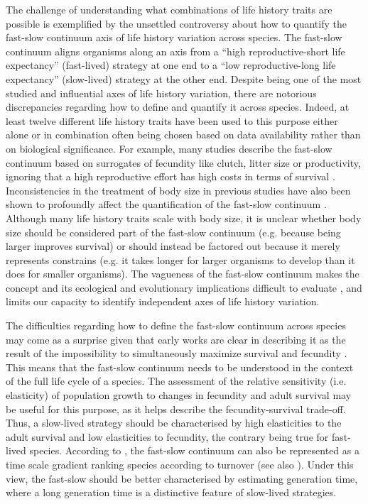 The challenge of understanding what combinations of life history traits are
possible is exemplified by the unsettled controversy about how to quantify the
fast-slow continuum axis of life history variation across species. The fast-slow
continuum aligns organisms along an axis from a “high reproductive-short life
expectancy” (fast-lived) strategy at one end to a “low reproductive-long life
expectancy” (slow-lived) strategy at the other end. Despite being one of the
most studied and influential axes of life history variation, there are notorious
discrepancies regarding how to define and quantify it across species. Indeed, at
least twelve different life history traits have been used to this purpose either
alone or in combination often being chosen based on data availability rather
than on biological significance. For example, many studies describe the
fast-slow continuum based on surrogates of fecundity like clutch, litter size
or productivity, ignoring that a high reproductive effort has high costs in
terms of survival \citep{Adler2014}. Inconsistencies in the treatment of body
size in previous studies have also been shown to profoundly affect the
quantification of the fast-slow continuum \citep{Jeschke2009}.
Although many life history traits scale with body size, it is unclear whether
body size should be considered part of the fast-slow continuum (e.g. because
being larger improves survival) or should instead be factored out because it
merely represents constrains (e.g. it takes longer for larger organisms to
develop than it does for smaller organisms). The vagueness of the fast-slow
continuum makes the concept and its ecological and evolutionary implications
difficult to evaluate \citep{Jeschke2009}, and limits our capacity to identify
independent axes of life history variation.

The difficulties regarding how to define the fast-slow continuum across species
may come as a surprise given that early works are clear in describing it as the
result of the impossibility to simultaneously maximize survival and fecundity
\citep{Stearns1983a, Saether1988}. This means that the fast-slow continuum needs
to be understood in the context of the full life cycle of a species. The
assessment of the relative sensitivity (i.e. elasticity) of population growth to
changes in fecundity and adult survival may be useful for this purpose, as it
helps describe the fecundity-survival trade-off. Thus, a slow-lived strategy
should be characterised by high elasticities to the adult survival and low
elasticities to fecundity, the contrary being true for fast-lived species.
According to \citet{Gaillard1989}, the fast-slow continuum can also be 
represented as a time scale gradient ranking species according to turnover (see 
also \citet{Jeschke2009,Saether2013,Adler2014}⁠). Under this view, the
fast-slow should be better characterised by estimating generation time, where a 
long generation time is a distinctive feature of slow-lived strategies.

